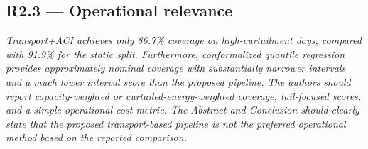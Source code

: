 \documentclass[11pt,a4paper]{article}
\newenvironment{revcomment}
  {\begin{mdframed}[backgroundcolor=quotebg,linecolor=quoterule,linewidth=0.4pt,
    innertopmargin=6pt,innerbottommargin=6pt,skipabove=8pt,skipbelow=8pt]\itshape}
  {\end{mdframed}}
\begin{document}
\subsection*{R2.3 --- Operational relevance}

\begin{revcomment}
Transport+ACI achieves only 86.7\% coverage on high-curtailment days, compared with 91.9\% for the static split. Furthermore, conformalized quantile regression provides approximately nominal coverage with substantially narrower intervals and a much lower interval score than the proposed pipeline. The authors should report capacity-weighted or curtailed-energy-weighted coverage, tail-focused scores, and a simple operational cost metric. The Abstract and Conclusion should clearly state that the proposed transport-based pipeline is not the preferred operational method based on the reported comparison.
\end{revcomment}
\end{document}

